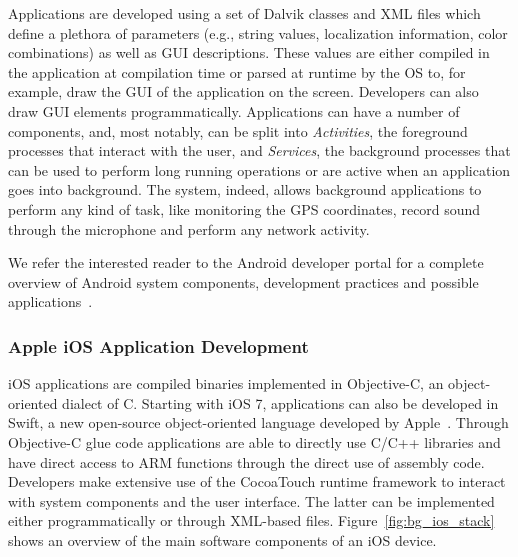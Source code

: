 Applications are developed using a set of Dalvik classes and XML files which define a plethora of parameters (e.g., string values, localization information, color combinations) as well as GUI descriptions. These values are either compiled in the application at compilation time or parsed at runtime by the OS to, for example, draw the GUI of the application on the screen. Developers can also draw GUI elements programmatically. Applications can have a number of components, and, most notably, can be split into \emph{Activities}, the foreground processes that interact with the user, and \emph{Services}, the background processes that can be used to perform long running operations or are active when an application goes into background. The system, indeed, allows background applications to perform any kind of task, like monitoring the GPS coordinates, record sound through the microphone and perform any network activity. 


We refer the interested reader to the Android developer portal for a complete overview of Android system components, development practices and possible applications~\cite{androidkernel}.

\subsubsection*{Apple iOS Application Development}

iOS applications are compiled binaries implemented in Objective-C, an
object-oriented dialect of C. Starting with iOS 7, applications can also be
developed in Swift, a new open-source object-oriented language developed by Apple~\cite{swift}. Through Objective-C glue code applications are able
to directly use C/C++ libraries and have direct access to ARM functions through
the direct use of assembly code. Developers make extensive use of the CocoaTouch
runtime framework to interact with system components and the user interface. The latter can be implemented either programmatically or
through XML-based files. Figure~\ref{fig:bg_ios_stack} shows an overview of the
main software components of an iOS device.

